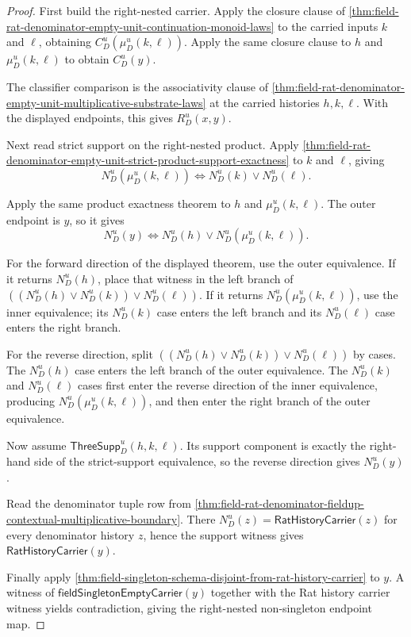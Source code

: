 \begin{proof}
First build the right-nested carrier. Apply the closure clause of
\autoref{thm:field-rat-denominator-empty-unit-continuation-monoid-laws} to the
carried inputs $k$ and $\ell$, obtaining $C_D^u(\mu_D^u(k,\ell))$. Apply the
same closure clause to $h$ and $\mu_D^u(k,\ell)$ to obtain $C_D^u(y)$.

The classifier comparison is the associativity clause of
\autoref{thm:field-rat-denominator-empty-unit-multiplicative-substrate-laws}
at the carried histories $h,k,\ell$. With the displayed endpoints, this gives
$R_D^u(x,y)$.

Next read strict support on the right-nested product. Apply
\autoref{thm:field-rat-denominator-empty-unit-strict-product-support-exactness}
to $k$ and $\ell$, giving
$$
N_D^u(\mu_D^u(k,\ell))
\Longleftrightarrow
N_D^u(k)\lor N_D^u(\ell).
$$

Apply the same product exactness theorem to $h$ and $\mu_D^u(k,\ell)$. The
outer endpoint is $y$, so it gives
$$
N_D^u(y)
\Longleftrightarrow
N_D^u(h)\lor N_D^u(\mu_D^u(k,\ell)).
$$

For the forward direction of the displayed theorem, use the outer equivalence.
If it returns $N_D^u(h)$, place that witness in the left branch of
$((N_D^u(h)\lor N_D^u(k))\lor N_D^u(\ell))$. If it returns
$N_D^u(\mu_D^u(k,\ell))$, use the inner equivalence; its $N_D^u(k)$ case enters
the left branch and its $N_D^u(\ell)$ case enters the right branch.

For the reverse direction, split
$((N_D^u(h)\lor N_D^u(k))\lor N_D^u(\ell))$ by cases. The $N_D^u(h)$ case enters
the left branch of the outer equivalence. The $N_D^u(k)$ and $N_D^u(\ell)$ cases
first enter the reverse direction of the inner equivalence, producing
$N_D^u(\mu_D^u(k,\ell))$, and then enter the right branch of the outer
equivalence.

Now assume $\mathsf{ThreeSupp}_D^u(h,k,\ell)$. Its support component is exactly
the right-hand side of the strict-support equivalence, so the reverse direction
gives $N_D^u(y)$.

Read the denominator tuple row from
\autoref{thm:field-rat-denominator-fieldup-contextual-multiplicative-boundary}.
There $N_D^u(z)=\mathsf{RatHistoryCarrier}(z)$ for every denominator history
$z$, hence the support witness gives $\mathsf{RatHistoryCarrier}(y)$.

Finally apply
\autoref{thm:field-singleton-schema-disjoint-from-rat-history-carrier} to
$y$. A witness of $\mathsf{fieldSingletonEmptyCarrier}(y)$ together with the Rat
history carrier witness yields contradiction, giving the right-nested
non-singleton endpoint map.
\end{proof}

